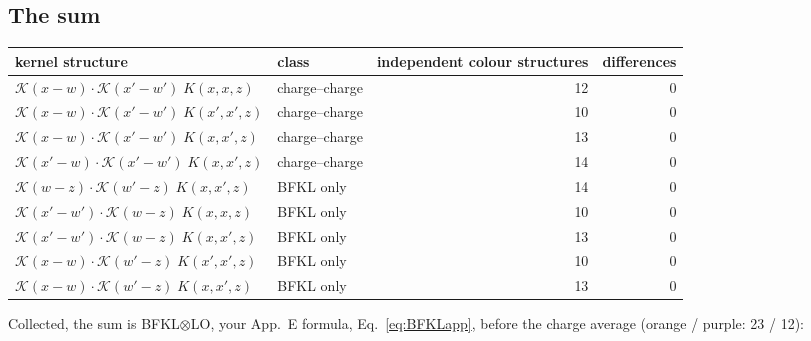 \documentclass[10pt]{article}
\numberwithin{equation}{section}
\begin{document}
\subsection{The sum}
\begin{table}[H]\centering\small
\begin{tabular}{@{}llrr@{}}\toprule
kernel structure & class & independent colour structures & differences\\\midrule
$\mathcal K(x-w)\cdot\mathcal K(x'-w')\;K(x,x,z)$ & {\color{CC}charge--charge} & 12 & 0\\
$\mathcal K(x-w)\cdot\mathcal K(x'-w')\;K(x',x',z)$ & {\color{CC}charge--charge} & 10 & 0\\
$\mathcal K(x-w)\cdot\mathcal K(x'-w')\;K(x,x',z)$ & {\color{CC}charge--charge} & 13 & 0\\
$\mathcal K(x'-w)\cdot\mathcal K(x'-w')\;K(x,x',z)$ & {\color{CC}charge--charge} & 14 & 0\\
$\mathcal K(w-z)\cdot\mathcal K(w'-z)\;K(x,x',z)$ & {\color{BFK}BFKL only} & 14 & 0\\
$\mathcal K(x'-w')\cdot\mathcal K(w-z)\;K(x,x,z)$ & {\color{BFK}BFKL only} & 10 & 0\\
$\mathcal K(x'-w')\cdot\mathcal K(w-z)\;K(x,x',z)$ & {\color{BFK}BFKL only} & 13 & 0\\
$\mathcal K(x-w)\cdot\mathcal K(w'-z)\;K(x',x',z)$ & {\color{BFK}BFKL only} & 10 & 0\\
$\mathcal K(x-w)\cdot\mathcal K(w'-z)\;K(x,x',z)$ & {\color{BFK}BFKL only} & 13 & 0\\
\bottomrule
\end{tabular}
\end{table}
\noindent Collected, the sum is BFKL$\otimes$LO, your App.~E formula, Eq.~\eqref{eq:BFKLapp}, before the charge average (orange / purple: 23 / 12):
\end{document}
